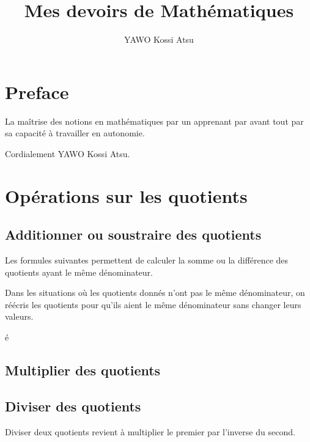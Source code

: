 \documentclass[12pt,a4paper]{report}
\author{YAWO Kossi Atsu}
\title{Mes devoirs de Mathématiques}
\begin{document}
\dominitoc

\tableofcontents
\chapter*{Preface}
La maîtrise des notions en mathématiques par un apprenant par avant tout par sa capacité à travailler en autonomie.

\vspace{1cm}
Cordialement YAWO Kossi Atsu.
\chapter{Opérations sur les quotients}
\section{Additionner ou soustraire des quotients}
\begin{memento}
\begin{defnslist}
\item Les formules suivantes permettent de calculer la somme ou la différence des quotients ayant le même dénominateur.\\
 \qquad \qquad \qquad {}

\item Dans les situations où les quotients donnés n'ont pas le même dénominateur, on réécris les quotients pour qu'ils aient le même dénominateur sans changer leurs valeurs.
\end{defnslist}
é\end{memento}

\section{Multiplier des quotients}
\begin{memento}
\end{memento}

\section{Diviser des quotients}
\begin{memento}
Diviser deux quotients revient à multiplier le premier par l'inverse du second.\\
\end{memento}
\end{document}
